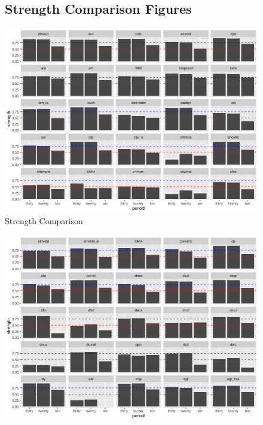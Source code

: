 \begin{landscape}
\begin{figure}[ht]
\subsection{Strength Comparison Figures}\label{strength_figures}
			\centering
			\caption{Strength Comparison}\label{figure:strength_compare}
				\includegraphics[scale = 0.75]{strength_comparison_I}
\end{figure}
\end{landscape}



\begin{landscape}
\begin{figure}[ht]
		\includegraphics[scale = 0.75]{strength_comparison_II}
		\centering
	\end{figure}
\end{landscape}

